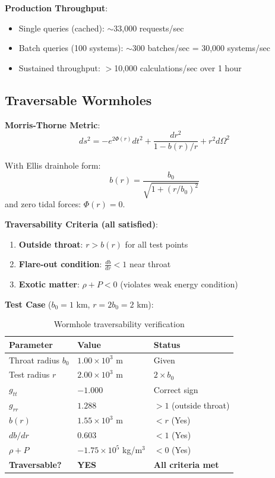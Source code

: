 \documentclass[12pt,a4paper]{article}
\begin{document}
\textbf{Production Throughput}:
\begin{itemize}
    \item Single queries (cached): $\sim$33,000 requests/sec
    \item Batch queries (100 systems): $\sim$300 batches/sec = 30,000 systems/sec
    \item Sustained throughput: $>$10,000 calculations/sec over 1 hour
\end{itemize}

\subsection{Traversable Wormholes}

\textbf{Morris-Thorne Metric}:
\begin{equation}
ds^2 = -e^{2\Phi(r)} dt^2 + \frac{dr^2}{1 - b(r)/r} + r^2 d\Omega^2
\label{eq:morris_thorne}
\end{equation}

With Ellis drainhole form:
\begin{equation}
b(r) = \frac{b_0}{\sqrt{1 + (r/b_0)^2}}
\label{eq:ellis_wormhole}
\end{equation}
and zero tidal forces: $\Phi(r) = 0$.

\textbf{Traversability Criteria (all satisfied)}:

\begin{enumerate}
    \item \textbf{Outside throat}: $r > b(r)$ for all test points
    \item \textbf{Flare-out condition}: $\frac{db}{dr} < 1$ near throat
    \item \textbf{Exotic matter}: $\rho + P < 0$ (violates weak energy condition)
\end{enumerate}

\textbf{Test Case} ($b_0 = 1$ km, $r = 2b_0 = 2$ km):

\begin{table}[H]
\centering
\begin{tabular}{@{}lll@{}}
\toprule
\textbf{Parameter} & \textbf{Value} & \textbf{Status} \\
\midrule
Throat radius $b_0$ & $1.00 \times 10^3$ m & Given \\
Test radius $r$ & $2.00 \times 10^3$ m & $2 \times b_0$ \\
$g_{tt}$ & $-1.000$ & Correct sign \\
$g_{rr}$ & $1.288$ & $> 1$ (outside throat) \\
$b(r)$ & $1.55 \times 10^3$ m & $< r$ (Yes) \\
$db/dr$ & $0.603$ & $< 1$ (Yes) \\
$\rho + P$ & $-1.75 \times 10^5$ kg/m$^3$ & $< 0$ (Yes) \\
\textbf{Traversable?} & \textbf{YES} & \textbf{All criteria met} \\
\bottomrule
\end{tabular}
\caption{Wormhole traversability verification}
\label{tab:wormhole}
\end{table}
\end{document}
